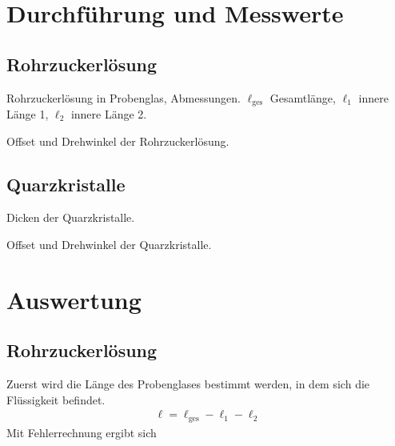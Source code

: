 \documentclass{article}
\begin{document}
\section{Durchführung und Messwerte}

\subsection{Rohrzuckerlösung}

\begin{table}[H]
\caption{Rohrzuckerlösung in Probenglas, Abmessungen. $\ell_\text{ges}$ Gesamtlänge, $\ell_1$ innere Länge 1, $\ell_2$ innere Länge 2.}
\label{tab:rohrzucker_abmessungen}
\centering

\end{table}




\begin{table}[H]
\caption{Offset und Drehwinkel der Rohrzuckerlösung.}
\label{tab:rohrzucker_winkel}
\centering

\end{table}


\subsection{Quarzkristalle}


\begin{table}[H]
\caption{Dicken der Quarzkristalle.}
\label{tab:kristalle_dicken}
\centering

\end{table}




\begin{table}[H]
\caption{Offset und Drehwinkel der Quarzkristalle.}
\label{tab:kristall_winkel}
\centering

\end{table}


\section{Auswertung}


\subsection{Rohrzuckerlösung}
Zuerst wird die Länge des Probenglases bestimmt werden, in dem sich die Flüssigkeit befindet.
\begin{align*}
\ell = \ell_\text{ges} - \ell_1 - \ell_2
\end{align*}
Mit Fehlerrechnung ergibt sich

\end{document}
